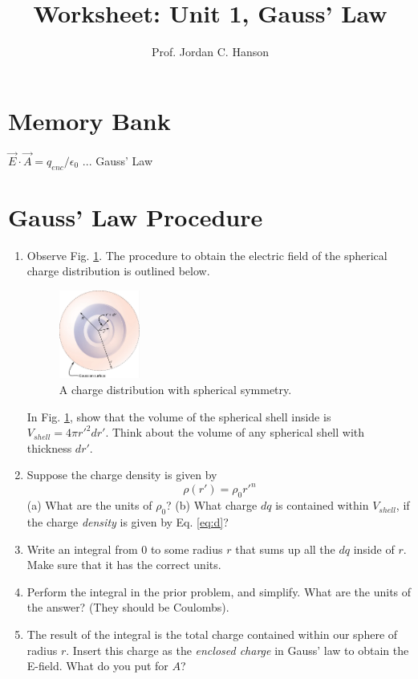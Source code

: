 \documentclass{article}
\begin{document}
\title{Worksheet: Unit 1, Gauss' Law}
\author{Prof. Jordan C. Hanson}

\maketitle

\section{Memory Bank}

$\vec{E} \cdot \vec{A} = q_{enc}/\epsilon_0$ ... Gauss' Law

\section{Gauss' Law Procedure}

\begin{enumerate}
\item Observe Fig. \ref{fig:spheres4}.  The procedure to obtain the electric field of the spherical charge distribution is outlined below.
\begin{figure}[ht]
\centering
\includegraphics[width=0.25\textwidth]{spheres4.png}
\caption{\label{fig:spheres4} A charge distribution with spherical symmetry.}
\end{figure}
In Fig. \ref{fig:spheres4}, show that the volume of the spherical shell inside is $V_{shell} = 4\pi r'^2 dr'$.  Think about the volume of any spherical shell with thickness $dr'$. \\ \vspace{0.5cm}
\item Suppose the charge density is given by
\begin{equation}
\rho(r') = \rho_0 r'^n \label{eq:d}
\end{equation}
(a) What are the units of $\rho_0$? (b) What charge $dq$ is contained within $V_{shell}$, if the charge \textit{density} is given by Eq. \ref{eq:d}? \\ \vspace{1cm}
\item Write an integral from $0$ to some radius $r$ that sums up all the $dq$ inside of $r$. Make sure that it has the correct units.  \\ \vspace{1cm}
\item Perform the integral in the prior problem, and simplify.  What are the units of the answer?  (They should be Coulombs). \\ \vspace{1cm}
\item The result of the integral is the total charge contained within our sphere of radius $r$.  Insert this charge as the \textit{enclosed charge} in Gauss' law to obtain the E-field.  What do you put for $A$?
\end{enumerate}
\end{document}
